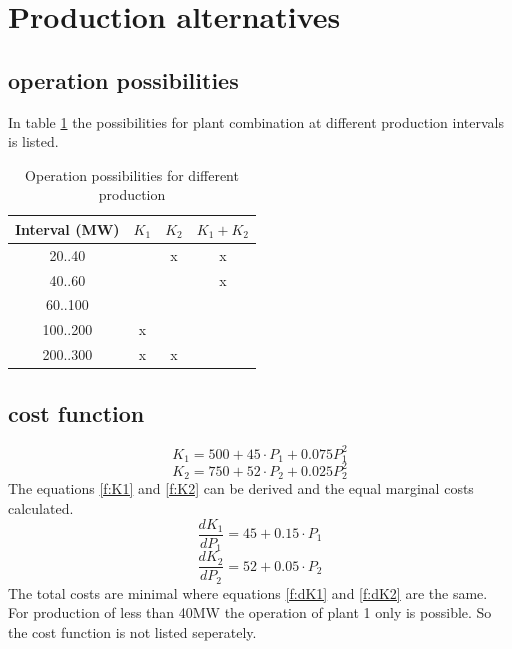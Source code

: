 \documentclass{article}
\begin{document}
	\section{Production alternatives}
	\subsection{operation possibilities}
In table \ref{tab:oppos} the possibilities for plant combination at different production intervals is listed.
	\begin{table}[hbt!]
\begin{center}
\begin{tabular}[h]{|c|c|c|c|}
\hline 
Interval (MW)	 & $K_1$ 		& $K_2$ 		& $K_1+K_2$		\\ 
\hline
20..40 			& \checkmark	&	x			& x				\\
40..60 & 			\checkmark & \checkmark  & x				\\
60..100 & 		 \checkmark	& \checkmark	& \checkmark 	\\
100..200 		& x				& \checkmark	& \checkmark	\\
200..300 		& x				& x				& \checkmark	\\
\hline
\end{tabular}
\caption{Operation possibilities for different production}\label{tab:oppos}
\end{center}
\end{table}

\subsection{cost function}
	\begin{equation}
		K_1=500+45\cdot P_1 + 0.075 P_1^2
		\label{f:K1}
	\end{equation}
	\begin{equation}
		K_2=750+52\cdot P_2 + 0.025 P_2^2
		\label{f:K2}
	\end{equation}
The equations \ref{f:K1} and \ref{f:K2} can be derived and the equal marginal costs calculated.
	\begin{equation}
		\frac{dK_1}{dP_1}=45+0.15\cdot P_1
		\label{f:dK1}
	\end{equation}
	\begin{equation}
		\frac{dK_2}{dP_2}=52+0.05\cdot P_2
		\label{f:dK2}
	\end{equation}
	The total costs are minimal where equations \ref{f:dK1} and \ref{f:dK2} are the same. For production of less than 40MW the operation of plant 1 only is possible. So the cost function is not listed seperately.
\end{document}
